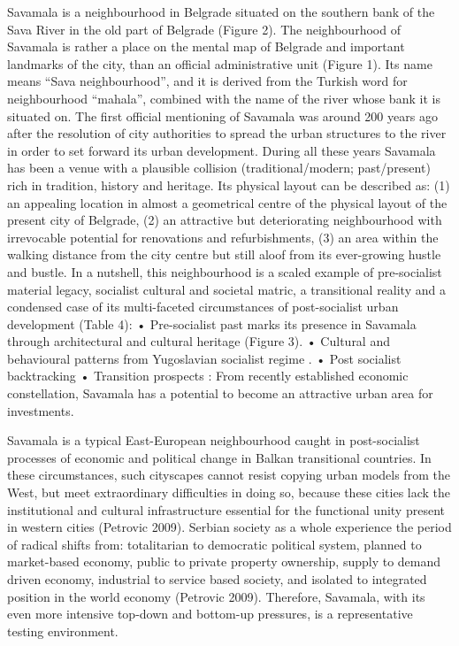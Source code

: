 \documentclass[11pt]{report}
\begin{document}
Savamala is a neighbourhood in Belgrade situated on the southern bank of the Sava River in the old part of Belgrade (Figure 2). The neighbourhood of Savamala is rather a place on the mental map of Belgrade and important landmarks of the city, than an official administrative unit (Figure 1).  Its name means “Sava neighbourhood”, and it is derived from the Turkish word for neighbourhood “mahala”, combined with the name of the river whose bank it is situated on. The first official mentioning of Savamala was around 200 years ago after the resolution of city authorities to spread the urban structures to the river in order to set forward its urban development. During all these years Savamala has been a venue with a plausible collision (traditional/modern; past/present) rich in tradition, history and heritage. Its physical layout can be described as: (1) an appealing location in almost a geometrical centre of the physical layout of the present city of Belgrade, (2) an attractive but deteriorating neighbourhood with irrevocable potential for renovations and refurbishments, (3) an area within the walking distance from the city centre but still aloof from its ever-growing hustle and bustle. In a nutshell, this neighbourhood is a scaled example of pre-socialist material legacy, socialist cultural and societal matric, a transitional reality and a condensed case of its multi-faceted circumstances of post-socialist urban development (Table 4):
•	Pre-socialist past marks its presence in Savamala through architectural and cultural heritage  (Figure 3).
•	Cultural and behavioural patterns from Yugoslavian socialist regime . 
•	Post socialist backtracking 
•	Transition prospects : From recently established economic constellation, Savamala has a potential to become an attractive urban area for investments.

Savamala is a typical East-European neighbourhood caught in post-socialist processes of economic and political change in Balkan transitional countries. In these circumstances, such cityscapes cannot resist copying urban models from the West, but meet extraordinary difficulties in doing so, because these cities lack the institutional and cultural infrastructure essential for the functional unity present in western cities (Petrovic 2009). Serbian society as a whole experience the period of radical shifts from: totalitarian to democratic political system, planned to market-based economy, public to private property ownership, supply to demand driven economy, industrial to service based society, and isolated to integrated position in the world economy (Petrovic 2009). Therefore, Savamala, with its even more intensive top-down and bottom-up pressures, is a representative testing environment. 
\end{document}
